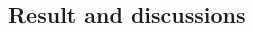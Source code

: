 \documentclass[final]{beamer}\usepackage{graphicx, color}
\begin{document}
\begin{frame}[fragile]
\begin{multicols}{2}
\section{Result and discussions}

 


\end{multicols}
\end{frame}
\end{document}
